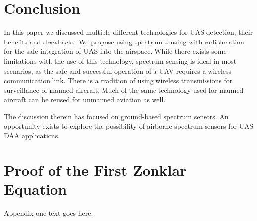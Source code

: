 \documentclass[journal,transmag]{IEEEtran}
\begin{document}
\section{Conclusion}
In this paper we discussed multiple different technologies for UAS detection, their benefits and drawbacks.  We propose using spectrum sensing with radiolocation for the safe integration of UAS into the airspace. While there exists some limitations with the use of this technology, spectrum sensing is ideal in most scenarios, as the safe and successful operation of a UAV requires a wireless communication link.  There is a tradition of using wireless transmissions for surveillance of manned aircraft. Much of the same technology used for manned aircraft can be reused for unmanned aviation as well.

The discussion therein has focused on ground-based spectrum sensors. An opportunity exists to explore the possibility of airborne spectrum sensors for UAS DAA applications. 



%


\appendices
\section{Proof of the First Zonklar Equation}
Appendix one text goes here.
\end{document}
